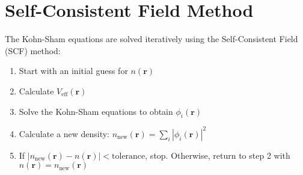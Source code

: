 \section{Self-Consistent Field Method}
The Kohn-Sham equations are solved iteratively using the Self-Consistent Field (SCF) method:
\begin{enumerate}
\item Start with an initial guess for $n(\mathbf{r})$
\item Calculate $V_{\text{eff}}(\mathbf{r})$
\item Solve the Kohn-Sham equations to obtain $\phi_i(\mathbf{r})$
\item Calculate a new density: $n_{\text{new}}(\mathbf{r}) = \sum_i |\phi_i(\mathbf{r})|^2$
\item If $|n_{\text{new}}(\mathbf{r}) - n(\mathbf{r})| < \text{tolerance}$, stop. Otherwise, return to step 2 with $n(\mathbf{r}) = n_{\text{new}}(\mathbf{r})$
\end{enumerate}
